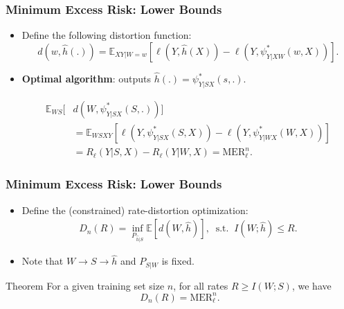 \documentclass[usenames,dvipsnames, 10pt]{beamer}
\newcommand{\E}{\mathbb{E}}
\begin{document}
\begin{frame}
	\frametitle{Minimum Excess Risk: Lower Bounds}
	\begin{itemize}		

								
		
		\item Define the following distortion function:
		\begin{equation*}
		\label{eq:d-def}
		d(w,\hat{h}(.)) = \E_{XY|W=w} [\ell(Y,\hat{h}(X))-\ell(Y,\psi^*_{Y|XW}(w, X))].
		\end{equation*}

		\pause
		
		\item \textbf{Optimal algorithm}: outputs $\hat{h}(.)= \psi^*_{Y|SX} (s, .)$.
		
		\begin{align*}
		\E_{WS}[&d(W,\psi^*_{Y|SX}(S, .))] \\
		&= \E_{WSXY}[\ell(Y,\psi^*_{Y|SX} (S, X)) -\ell(Y,\psi^*_{Y|WX}(W,X))]
		\\ &= R_\ell(Y|S,X) - R_\ell(Y|W,X) = \text{MER}_\ell^n.				
		\end{align*}
		


	\end{itemize}
\end{frame}

\begin{frame}
	\frametitle{Minimum Excess Risk: Lower Bounds}
	\begin{itemize}

	\item Define the (constrained) rate-distortion optimization:
	\begin{align}
	\label{eq:rate_distortion_base}
	D_n(R)= \inf_{P_{\hat{h}|S}} \E[d(W,\hat{h})], \;\;
	\mathrm{s.t.}\;\; I(W;\hat{h})\le R. \nonumber
	\end{align}
	
	\pause
	
	\item Note that $W \to S \to \hat{h}$ and $P_{S|W}$ is fixed.
	
	\end{itemize}

\begin{block}{Theorem}
	For a given training set size $n$, for all rates $R\ge I(W;S)$, we have 
	\begin{equation*}
	D_n(R) = \mathrm{{MER}}_\ell^n.
	\end{equation*}
\end{block}
\end{frame}
\end{document}
